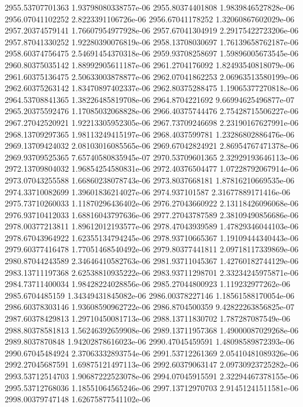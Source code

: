 {2955.53707701363 1.93798080338757e-06
2955.80374401808 1.9839846527828e-06
2956.07041102252 2.8223391106726e-06
2956.67041178252 1.32060867602029e-06
2957.20374579141 1.76607954977928e-06
2957.67041304919 2.29175422723206e-06
2957.87041330252 1.92280390076819e-06
2958.13708030697 1.76139658762187e-06
2958.60374756475 2.54691454370318e-06
2959.93708258697 1.59896005673545e-06
2960.80375035142 1.88992905611187e-06
2961.2704176092 1.82493540818079e-06
2961.60375136475 2.50633003878877e-06
2962.07041862253 2.06963513580199e-06
2962.60375263142 1.83470897402337e-06
2962.80375288475 1.19065377270818e-06
2964.53708841365 1.38226485819708e-06
2964.8704221692 9.66994625496877e-07
2965.20375592476 1.17085032068828e-06
2966.40375744476 2.75428715506227e-06
2967.27042520921 1.92213305952305e-06
2967.73709246698 2.23190167627991e-06
2968.13709297365 1.98113249415197e-06
2968.4037599781 1.23286802886476e-06
2969.13709424032 2.08103016085565e-06
2969.67042824921 2.86954767471378e-06
2969.93709525365 7.65740580835945e-07
2970.53709601365 2.32929193646113e-06
2972.13709804032 1.96854254580831e-06
2972.40376504477 1.07228792067914e-06
2973.07043255588 1.66860238078743e-06
2973.8037668181 1.87816210669535e-06
2974.33710082699 1.39601836214027e-06
2974.937101587 2.31677889171416e-06
2975.73710260033 1.11870296436402e-06
2976.27043660922 2.13118426096068e-06
2976.93710412033 1.68816043797636e-06
2977.27043787589 2.38109490856686e-06
2978.00377213811 1.89612012193577e-06
2978.47043939589 1.47829346044103e-06
2978.67043964922 1.62355134794245e-06
2978.93710665367 1.19109444340443e-06
2979.60377416478 1.77051468540492e-06
2979.80377441811 2.09718117339869e-06
2980.87044243589 2.34646410582763e-06
2981.93711045367 1.42760182744129e-06
2983.13711197368 2.62538810935222e-06
2983.93711298701 2.33234245975871e-06
2984.73711400034 1.98428224028856e-06
2985.27044800923 1.119232977262e-06
2985.6704485159 1.34349431845082e-06
2986.00378227146 1.18561588170054e-06
2986.60378303146 1.93608590962722e-06
2986.8704500359 9.42822263856825e-07
2987.60378429813 1.29710450081713e-06
2988.13711830702 1.787287087549e-06
2988.80378581813 1.56246392659908e-06
2989.13711957368 1.49000087029268e-06
2989.8037870848 1.94202878616023e-06
2990.47045459591 1.48098589872393e-06
2990.67045484924 2.37063332893754e-06
2991.53712261369 2.05410481089326e-06
2992.27045687591 1.69875121497113e-06
2992.60379063147 2.09730923725282e-06
2993.53712514703 1.90687222523078e-06
2994.07045915591 2.32294467378155e-06
2995.53712768036 1.18551064565246e-06
2997.13712970703 2.91451241511581e-06
2998.00379747148 1.62675877541102e-06
}
